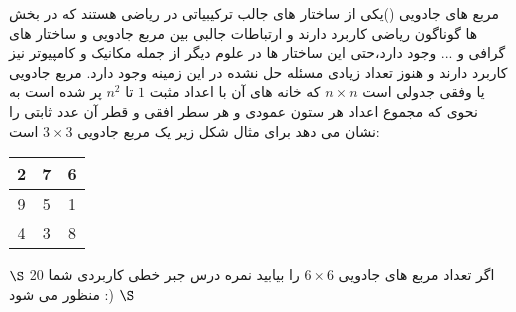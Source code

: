 \documentclass{article}
\begin{document}
مربع های جادویی ()یکی از ساختار های جالب ترکیبیاتی در ریاضی هستند که در بخش ها گوناگون ریاضی کاربرد دارند و ارتباطات جالبی بین مربع جادویی و ساختار های گرافی و ... وجود دارد،حتی این ساختار ها در علوم دیگر از جمله مکانیک و کامپیوتر نیز کاربرد دارند و هنوز تعداد زیادی مسئله حل نشده در این زمینه وجود دارد.
مربع جادویی یا وفقی جدولی است 
$n\times n$
که خانه های آن با اعداد مثبت 
$1$
تا 
$n^2$
پر شده است به نحوی که مجموع اعداد هر ستون عمودی و هر سطر افقی و قطر آن عدد ثابتی را نشان می دهد برای مثال شکل زیر یک مربع جادویی 
$3\times 3$
است:
\begin{center}

	\begin{tabular}{|c|c|c|}
		\hline
		2&7&6\\
		\hline 
		9&5&1\\
		\hline
		4&3&8\\
		\hline
	\end{tabular}		

\end{center}
$\S$
اگر تعداد مربع های جادویی 
$6\times 6$
را بیابید نمره درس جبر خطی کاربردی شما 20 منظور می شود :) 
$\S$
\end{document}
